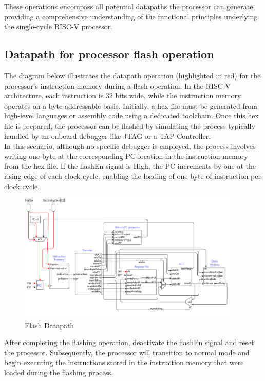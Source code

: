 These operations encompass all potential datapaths the processor can generate, providing a comprehensive understanding of the functional principles underlying the single-cycle RISC-V processor.


\subsection{Datapath for processor flash operation}

The diagram below illustrates the datapath operation (highlighted in red) for the processor's instruction memory during a flash operation. In the RISC-V architecture, each instruction is 32 bits wide, while the instruction memory operates on a byte-addressable basis. Initially, a hex file must be generated from high-level languages or assembly code using a dedicated toolchain. Once this hex file is prepared, the processor can be flashed by simulating the process typically handled by an onboard debugger like JTAG or a TAP Controller.
\\ 
\hfill \break
In this scenario, although no specific debugger is employed, the process involves writing one byte at the corresponding PC location in the instruction memory from the hex file. If the flashEn signal is High, the PC increments by one at the rising edge of each clock cycle, enabling the loading of one byte of instruction per clock cycle.

\begin{figure}[H]
    \centering
    \includegraphics[width=0.95\textwidth, height=0.4\textheight]{Image/04_flash.png}
    \caption{Flash Datapath}
    \label{fig:Flash Datapath}
\end{figure}

After completing the flashing operation, deactivate the flashEn signal and reset the processor. Subsequently, the processor will transition to normal mode and begin executing the instructions stored in the instruction memory that were loaded during the flashing process.


